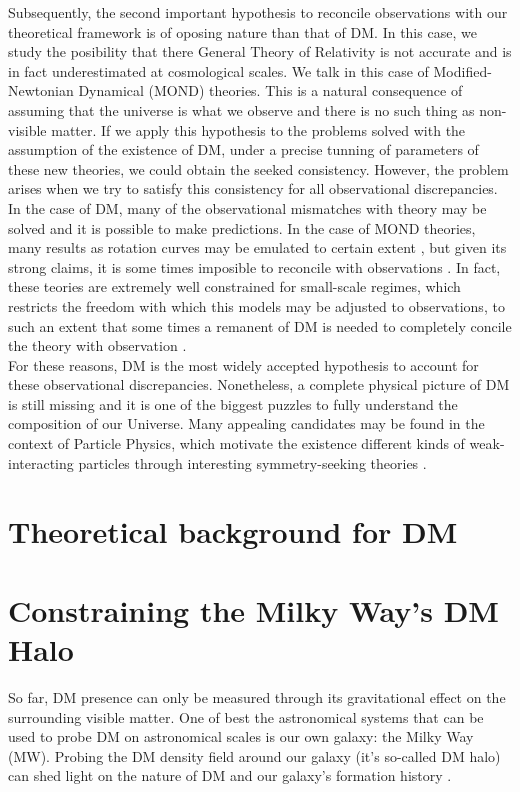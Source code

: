Subsequently, the second important hypothesis to reconcile observations with our theoretical framework is of oposing nature than that of DM. In this case, we study the posibility that there General Theory of Relativity is not accurate and is in fact underestimated at cosmological scales. We talk in this case of Modified-Newtonian Dynamical (MOND) theories. This is a natural consequence of assuming that the universe is what we observe and there is no such thing as non-visible matter. If we apply this hypothesis to the problems solved with the assumption of the existence of DM, under a precise tunning of parameters of these new theories, we could obtain the seeked consistency. However, the problem arises when we try to satisfy this consistency for all observational discrepancies. In the case of DM, many of the observational mismatches with theory may be solved and it is possible to make predictions. In the case of MOND theories, many results as rotation curves may be emulated to certain extent \cite{MOND}, but given its strong claims, it is some times imposible to reconcile with observations \cite{MOND NO}. In fact, these teories are extremely well constrained for small-scale regimes, which restricts the freedom with which this models may be adjusted to observations, to such an extent that some times a remanent of DM is needed to completely concile the theory with observation \cite{DM remanent.}.\\

For these reasons, DM is the most widely accepted hypothesis to account for these observational discrepancies. Nonetheless, a complete physical picture of DM is still missing and it is one of the biggest puzzles to fully understand the composition of our Universe. Many appealing candidates may be found in the context of Particle Physics, which motivate the existence different kinds of weak-interacting particles through interesting symmetry-seeking theories \cite{particle physics.}.\\

\section{Theoretical background for DM}


\section{Constraining the Milky Way's DM Halo}
So far, DM presence can only be measured through its gravitational effect on the surrounding visible matter. 
One of best the astronomical systems that can be used to probe DM on astronomical scales is our own galaxy: the Milky Way (MW).
Probing the DM density field around our galaxy (it's so-called DM halo) can shed light on the nature of DM \cite{Nipoti,ReadMoore} and our
galaxy's formation history \cite{Read1,Read2,Vera-Ciro2011}.\\

